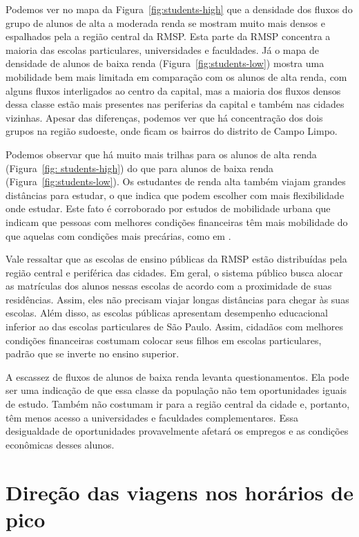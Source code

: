 Podemos ver no mapa da Figura~\ref{fig:students-high} que a densidade dos fluxos
do grupo de alunos de alta a moderada renda se mostram muito mais densos e
espalhados pela a região central da RMSP. Esta parte da RMSP concentra a maioria
das escolas particulares, universidades e faculdades. Já o mapa de densidade de
alunos de baixa renda (Figura~\ref{fig:students-low}) mostra uma mobilidade bem
mais limitada em comparação com os alunos de alta renda, com alguns fluxos
interligados ao centro da capital, mas a maioria dos fluxos densos dessa classe
estão mais presentes nas periferias da capital e também nas cidades vizinhas.
Apesar das diferenças, podemos ver que há concentração dos dois grupos na região
sudoeste, onde ficam os bairros do distrito de Campo Limpo.

Podemos observar que há muito mais trilhas para os alunos de alta renda
(Figura~\ref{fig: students-high}) do que para alunos de baixa renda
(Figura~\ref{fig:students-low}). Os estudantes de renda alta também viajam
grandes distâncias para estudar, o que indica que podem escolher com mais
flexibilidade onde estudar. Este fato é corroborado por estudos de mobilidade
urbana que indicam que pessoas com melhores condições financeiras têm mais
mobilidade do que aquelas com condições mais precárias, como em \citet{carruthers2005,
lucas2016}.

Vale ressaltar que as escolas de ensino públicas   da RMSP estão distribuídas pela região
central e periférica das cidades. Em geral, o sistema público busca alocar as
matrículas dos alunos nessas escolas de acordo com a proximidade de suas
residências. Assim, eles não precisam viajar longas distâncias para chegar às
suas escolas. Além disso, as escolas públicas apresentam desempenho educacional
inferior ao das escolas particulares de São Paulo. Assim, cidadãos com melhores
condições financeiras costumam colocar seus filhos em escolas particulares,
padrão que se inverte no ensino superior.

A escassez de fluxos de alunos de baixa renda levanta questionamentos. Ela pode
ser uma indicação de que essa classe da população não tem oportunidades iguais
de estudo. Também não costumam ir para a região central da cidade e, portanto,
têm menos acesso a universidades e faculdades complementares. Essa desigualdade
de oportunidades provavelmente afetará os empregos e as condições econômicas
desses alunos.

\section{Direção das viagens nos horários de pico}
\label{sec:peak-hours}

